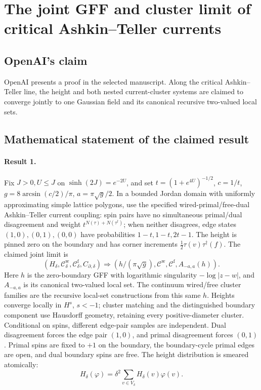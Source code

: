 \documentclass[11pt]{article}
\begin{document}
\section*{The joint GFF and cluster limit of critical Ashkin–Teller currents}

\subsection{OpenAI's claim}
OpenAI presents a proof in the selected manuscript. Along the critical Ashkin--Teller line, the height and both nested current-cluster systems are claimed to converge jointly to one Gaussian field and its canonical recursive two-valued local sets.

\subsection{Mathematical statement of the claimed result}
\paragraph{Result 1.} Fix \(J>0,U\le J\) on \(\sinh(2J)=e^{-2U}\), and set \(t=(1+e^{4U})^{-1/2}\), \(c=1/t\), \(g=8\arcsin(c/2)/\pi\), \(a=\pi\sqrt g/2\). In a bounded Jordan domain with uniformly approximating simple lattice polygons, use the specified wired-primal/free-dual Ashkin--Teller current coupling: spin pairs have no simultaneous primal/dual disagreement and weight \(t^{N(\tau)+N(\tau^\dagger)}\); when neither disagrees, edge states \((1,0),(0,1),(0,0)\) have probabilities \(1-t,1-t,2t-1\). The height is pinned zero on the boundary and has corner increments \(\tfrac12\tau(v)\tau^\dagger(f)\). The claimed joint limit is
\[
 (H_\delta,\mathcal C_\delta^{\mathrm w},\mathcal C_\delta^{\mathrm f},C_{\partial,\delta})
 \Longrightarrow(h/(\pi\sqrt g),\mathcal C^{\mathrm w},\mathcal C^{\mathrm f},A_{-a,a}(h)).
\]
Here \(h\) is the zero-boundary GFF with logarithmic singularity \(-\log|z-w|\), and \(A_{-a,a}\) is its canonical two-valued local set. The continuum wired/free cluster families are the recursive local-set constructions from this same \(h\). Heights converge locally in \(H^s\), \(s<-1\); cluster matching and the distinguished boundary component use Hausdorff geometry, retaining every positive-diameter cluster. Conditional on spins, different edge-pair samples are independent. Dual disagreement forces the edge pair $(1,0)$, and primal disagreement forces $(0,1)$. Primal spins are fixed to $+1$ on the boundary, the boundary-cycle primal edges are open, and dual boundary spins are free. The height distribution is smeared atomically:
\[
 H_\delta(\varphi)=\delta^2\sum_{v\in V_\delta}H_\delta(v)\varphi(v).
\]
\end{document}
